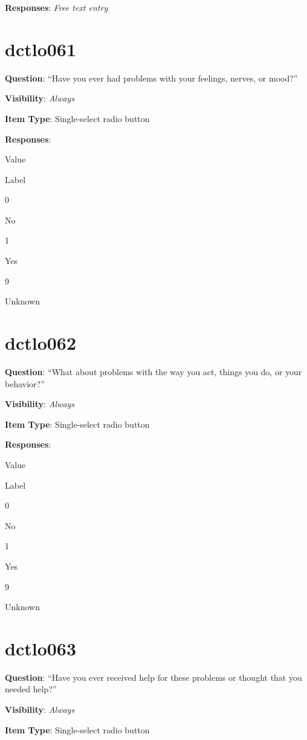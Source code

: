 \documentclass[]{book}
\begin{document}
\textbf{Responses}: \emph{Free text entry}

\hypertarget{dctlo061}{%
\section{dctlo061}\label{dctlo061}}

\textbf{Question}: ``Have you ever had problems with your feelings, nerves, or mood?''

\textbf{Visibility}: \emph{Always}

\textbf{Item Type}: Single-select radio button

\textbf{Responses}:

Value

Label

0

No

1

Yes

9

Unknown

\hypertarget{dctlo062}{%
\section{dctlo062}\label{dctlo062}}

\textbf{Question}: ``What about problems with the way you act, things you do, or your behavior?''

\textbf{Visibility}: \emph{Always}

\textbf{Item Type}: Single-select radio button

\textbf{Responses}:

Value

Label

0

No

1

Yes

9

Unknown

\hypertarget{dctlo063}{%
\section{dctlo063}\label{dctlo063}}

\textbf{Question}: ``Have you ever received help for these problems or thought that you needed help?''

\textbf{Visibility}: \emph{Always}

\textbf{Item Type}: Single-select radio button
\end{document}
